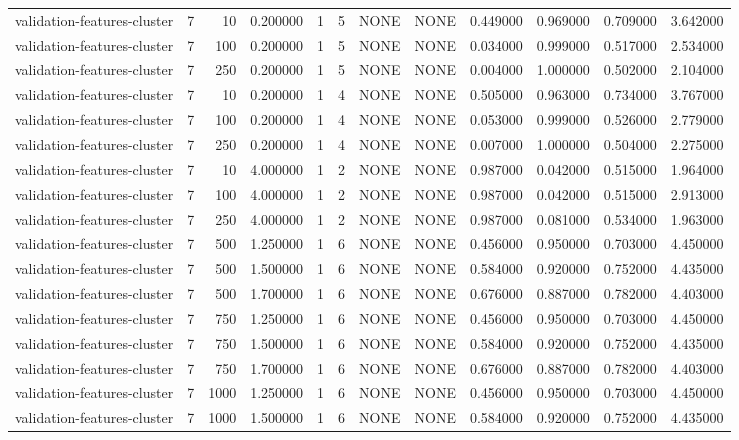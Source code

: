 \begin{tabular}{lrrrllllrrrr}
validation-features-cluster & 7 & 10 & 0.200000 & 1 & 5 & NONE & NONE & 0.449000 & 0.969000 & 0.709000 & 3.642000 \\
validation-features-cluster & 7 & 100 & 0.200000 & 1 & 5 & NONE & NONE & 0.034000 & 0.999000 & 0.517000 & 2.534000 \\
validation-features-cluster & 7 & 250 & 0.200000 & 1 & 5 & NONE & NONE & 0.004000 & 1.000000 & 0.502000 & 2.104000 \\
validation-features-cluster & 7 & 10 & 0.200000 & 1 & 4 & NONE & NONE & 0.505000 & 0.963000 & 0.734000 & 3.767000 \\
validation-features-cluster & 7 & 100 & 0.200000 & 1 & 4 & NONE & NONE & 0.053000 & 0.999000 & 0.526000 & 2.779000 \\
validation-features-cluster & 7 & 250 & 0.200000 & 1 & 4 & NONE & NONE & 0.007000 & 1.000000 & 0.504000 & 2.275000 \\
validation-features-cluster & 7 & 10 & 4.000000 & 1 & 2 & NONE & NONE & 0.987000 & 0.042000 & 0.515000 & 1.964000 \\
validation-features-cluster & 7 & 100 & 4.000000 & 1 & 2 & NONE & NONE & 0.987000 & 0.042000 & 0.515000 & 2.913000 \\
validation-features-cluster & 7 & 250 & 4.000000 & 1 & 2 & NONE & NONE & 0.987000 & 0.081000 & 0.534000 & 1.963000 \\
validation-features-cluster & 7 & 500 & 1.250000 & 1 & 6 & NONE & NONE & 0.456000 & 0.950000 & 0.703000 & 4.450000 \\
validation-features-cluster & 7 & 500 & 1.500000 & 1 & 6 & NONE & NONE & 0.584000 & 0.920000 & 0.752000 & 4.435000 \\
validation-features-cluster & 7 & 500 & 1.700000 & 1 & 6 & NONE & NONE & 0.676000 & 0.887000 & 0.782000 & 4.403000 \\
validation-features-cluster & 7 & 750 & 1.250000 & 1 & 6 & NONE & NONE & 0.456000 & 0.950000 & 0.703000 & 4.450000 \\
validation-features-cluster & 7 & 750 & 1.500000 & 1 & 6 & NONE & NONE & 0.584000 & 0.920000 & 0.752000 & 4.435000 \\
validation-features-cluster & 7 & 750 & 1.700000 & 1 & 6 & NONE & NONE & 0.676000 & 0.887000 & 0.782000 & 4.403000 \\
validation-features-cluster & 7 & 1000 & 1.250000 & 1 & 6 & NONE & NONE & 0.456000 & 0.950000 & 0.703000 & 4.450000 \\
validation-features-cluster & 7 & 1000 & 1.500000 & 1 & 6 & NONE & NONE & 0.584000 & 0.920000 & 0.752000 & 4.435000 \\

\end{tabular}
